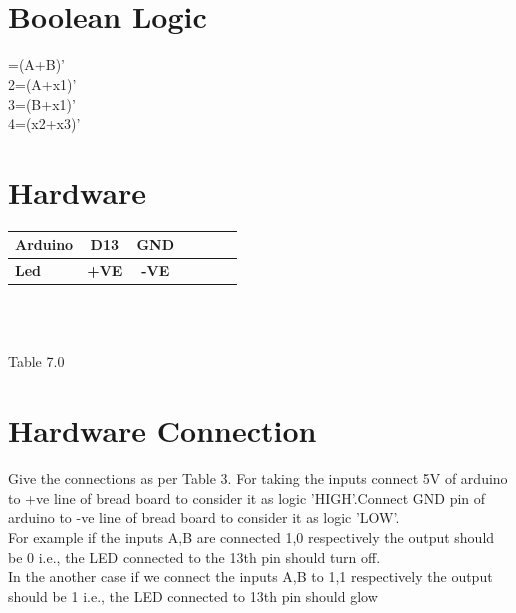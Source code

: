 \documentclass[10pt]{report}
\begin{document}
\begin{multicols}{2}
\
 \vspace{3mm}\\
\

  
  \centering  \section{Boolean Logic}
   =(A+B)'\\
   2=(A+x1)'\\ 
   3=(B+x1)'\\
   4=(x2+x3)' \\
   
   \section{Hardware}
   \begin{tabular}{|l|c|c|c|c|c|c|} \hline 
\textbf{Arduino} & \textbf{D13} & \textbf{GND} \\ \hline
\textbf{Led} & \textbf{+VE} & \textbf{-VE}\\ \hline
\end{tabular} \\
\ 
\centerline{Table 7.0}
   
 \section{Hardware Connection}
  \raggedright
  Give the connections as per Table 3. For taking the inputs connect 5V of arduino to +ve line of bread board to consider it as logic 'HIGH'.Connect GND pin of arduino to -ve line of bread board to consider it as logic 'LOW'.\\
For example if the inputs A,B are connected 1,0 respectively the output should be 0 i.e., the LED connected to the 13th pin should turn off.
\\
In the another case if we connect the inputs A,B to 1,1 respectively the output should be 1 i.e., the LED connected to 13th pin should glow


\end{multicols}
\end{document}
